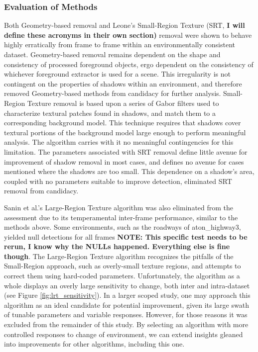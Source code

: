\documentclass[12pt]{report}
\begin{document}
\subsubsection{Evaluation of Methods}
Both Geometry-based removal and Leone's Small-Region Texture (SRT, \textbf{I will define these acronyms in their own section)} removal were shown to behave highly erratically from frame to frame within an environmentally consistent dataset. Geometry-based removal remains dependent on the shape and consistency of processed foreground objects, ergo dependent on the consistency of whichever foreground extractor is used for a scene. This irregularity is not contingent on the properties of shadows within an environment, and therefore removed Geometry-based methods from candidacy for further analysis. Small-Region Texture removal is based upon a series of Gabor filters used to characterize textural patches found in shadows, and match them to a corresponding background model. This technique requires that shadows cover textural portions of the background model large enough to perform meaningful analysis. The algorithm carries with it no meaningful contingencies for this limitation. The parameters associated with SRT removal define little avenue for improvement of shadow removal in most cases, and defines no avenue for cases mentioned where the shadows are too small. This dependence on a shadow's area, coupled with no parameters suitable to improve detection, eliminated SRT removal from candidacy. 

Sanin et al.'s Large-Region Texture algorithm was also eliminated from the assessment due to its temperamental inter-frame performance, similar to the methods above. Some environments, such as the roadways of aton\_highway3, yielded null detections for all frames \textbf{NOTE: This specific test needs to be rerun, I know why the NULLs happened. Everything else is fine though}. The Large-Region Texture algorithm recognizes the pitfalls of the Small-Region approach, such as overly-small texture regions, and attempts to correct them using hard-coded parameters. Unfortunately, the algorithm as a whole displays an overly large sensitivity to change, both inter and intra-dataset (see Figure \ref{fig:lrt_sensitivity}). In a larger scoped study, one may approach this algorithm as an ideal candidate for potential improvement, given its large swath of tunable parameters and variable responses. However, for those reasons it was excluded from the remainder of this study. By selecting an algorithm with more controlled responses to change of environment, we can extend insights gleaned into improvements for other algorithms, including this one.
\end{document}
